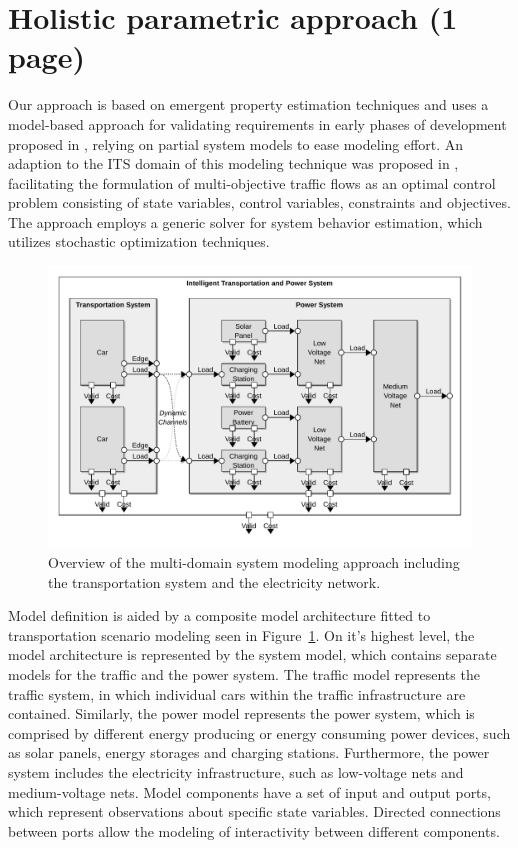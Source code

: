 \section{Holistic parametric approach (1 page)}
\label{section:contribution_1}

Our approach is based on emergent property estimation techniques \cite{hackenberg2012towards} and uses a model-based approach for validating requirements in early phases of development proposed in \cite{hackenberg2014rapid}, relying on partial system models to ease modeling effort. An adaption to the ITS domain of this modeling technique was proposed in \cite{ascher2014early}, facilitating the formulation of multi-objective traffic flows as an optimal control problem consisting of state variables, control variables, constraints and objectives. The approach employs a generic solver for system behavior estimation, which utilizes stochastic optimization techniques.

\begin{figure}[h]
	\centering
	\includegraphics[width=\columnwidth]{../gfx/model.pdf}
	\caption{Overview of the multi-domain system modeling approach including the transportation system and the electricity network.}
	\label{fig:model}
\end{figure}

Model definition is aided by a composite model architecture fitted to transportation scenario modeling seen in Figure~\ref{fig:model}. On it's highest level, the model architecture is represented by the system model, which contains separate models for the traffic and the power system. The traffic model represents the traffic system, in which individual cars within the traffic infrastructure are contained. Similarly, the power model represents the power system, which is comprised by different energy producing or energy consuming power devices, such as solar panels, energy storages and charging stations. Furthermore, the power system includes the electricity infrastructure, such as low-voltage nets and medium-voltage nets. Model components have a set of input and output ports, which represent observations about specific state variables. Directed connections between ports allow the modeling of interactivity between different components.


